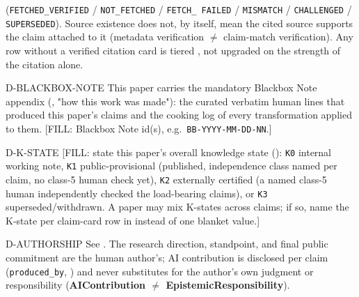 \begin{disclaimers}
    (\texttt{FETCHED\_VERIFIED} / \texttt{NOT\_FETCHED} / \texttt{FETCH\_
    FAILED} / \texttt{MISMATCH} / \texttt{CHALLENGED} / \texttt{SUPERSEDED}).
    Source existence does not, by itself, mean the cited source supports the
    claim attached to it (metadata verification $\neq$ claim-match
    verification). Any row without a verified citation card is tiered
    \OpenTier{}, not upgraded on the strength of the citation alone.
  \item[D-BLACKBOX-NOTE] This paper carries the mandatory Blackbox Note
    appendix (, "how this work was made"): the curated
    verbatim human lines that produced this paper's claims and the cooking
    log of every transformation applied to them. [FILL: Blackbox Note id(s),
    e.g.\ \texttt{BB-YYYY-MM-DD-NN}.]
  \item[D-K-STATE] [FILL: state this paper's overall knowledge state
    (\Cref{sec:kstate}): \texttt{K0} internal working note, \texttt{K1}
    public-provisional (published, independence class named per claim, no
    class-5 human check yet), \texttt{K2} externally certified (a named
    class-5 human independently checked the load-bearing claims), or
    \texttt{K3} superseded/withdrawn. A paper may mix K-states across claims;
    if so, name the K-state per claim-card row in \Cref{tab:claim-matrix}
    instead of one blanket value.]
  \item[D-AUTHORSHIP] See . The research direction,
    standpoint, and final public commitment are the human author's; AI
    contribution is disclosed per claim (\texttt{produced\_by},
    ) and never substitutes for the author's own
    judgment or responsibility (\textbf{AIContribution $\neq$
    EpistemicResponsibility}).
\end{disclaimers}
